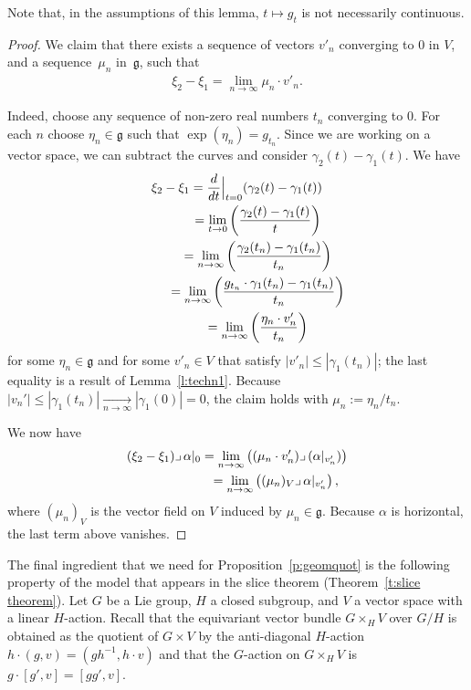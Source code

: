 \documentclass[pdftex]{sigma}
\numberwithin{equation}{section}
\newcommand{\g}{{\mathfrak{g}}} %
\newcommand{\hook}{{\lrcorner\,}} %
\newcommand{\hypref}[2]{{#2~\ref{#1}}}
\begin{document}
Note that, in the assumptions of this lemma,
$t \mapsto g_t$ is not necessarily continuous.

\begin{proof}
We claim that there exists a sequence of vectors $v'_n$
converging to $0$ in $V$, and a sequence~$\mu_n$ in~$\g$, such that
\begin{gather*} \xi_2 - \xi_1 = \underset{n\to\infty}{\lim} \mu_n\cdot v'_n. \end{gather*}

Indeed,
choose any sequence of non-zero real numbers $t_n$ converging to $0$.
For
each $n$ choose $\eta_n \in \g$ such that $\exp(\eta_n)=g_{t_n}$.
Since we are working on a vector space, we can subtract the curves
and consider $\gamma_2(t) - \gamma_1(t)$. We have
\begin{gather*}
 \xi_2 - \xi_1 = \frac{d}{dt} \Big|_{t=0} (\gamma_2(t)-\gamma_1(t))\\
  \hphantom{\xi_2 - \xi_1}{}
 = \underset{t \to 0} {\lim}
 \left( \frac{\gamma_2(t)-\gamma_1(t)}{t} \right)\\
 \hphantom{\xi_2 - \xi_1}{}
 = \underset{n\to\infty} {\lim}
 \left( \frac{\gamma_2(t_n)-\gamma_1(t_n)}{t_n} \right) \\
 \hphantom{\xi_2 - \xi_1}{}
 = \underset{n\to\infty}{\lim}
 \left( \frac{g_{t_n} \cdot \gamma_1(t_n) - \gamma_1(t_n)}{t_n} \right)\\
 \hphantom{\xi_2 - \xi_1}{}
 = \underset{n\to\infty}{\lim}
 \left( \frac{ \eta_n \cdot v'_n }{t_n} \right)
\end{gather*}
for some $\eta_n \in \g$ and
for some $v'_n \in V$ that satisfy $ |v'_n| \leq |\gamma_1(t_n)| $;
the last equality is a result of \hypref{l:techn1}{Lemma}.
Because $|v_n'| \leq |\gamma_1(t_n)| \underset{n\to\infty}{\to} |\gamma_1(0)|
 = 0$,
the claim holds with $\mu_n := \eta_n/t_n$.

We now have
\begin{gather*}
 (\xi_2-\xi_1) \hook \alpha|_0 = \underset{n\to\infty}{\lim}
 \left( (\mu_n\cdot v'_n) \hook(\alpha|_{v'_n}) \right)\\
 \hphantom{(\xi_2-\xi_1) \hook \alpha|_0}{}
 = \underset{n\to\infty}{\lim}
 \left( (\mu_n)_V\hook\alpha|_{v'_n} \right),
\end{gather*}
where $(\mu_n)_V$ is the vector f\/ield on $V$ induced by $\mu_n\in\g$.
Because $\alpha$ is horizontal, the last term above vanishes.
\end{proof}

The f\/inal ingredient that we need for Proposition~\ref{p:geomquot} is
the following property of the model that appears in the slice theorem
(Theorem~\ref{t:slice theorem}).
Let $G$ be a Lie group, $H$ a closed subgroup, and $V$ a vector space
with a linear $H$-action. Recall that the equivariant vector bundle
$ G \times_H V $
over $G/H$ is obtained as the quotient of $G \times V$
by the anti-diagonal $H$-action $h \cdot (g,v) = (g h^{-1} , h \cdot v)$
and that the $G$-action on $G\times_H V$ is $g\cdot[g',v]=[gg',v]$.
\end{document}
